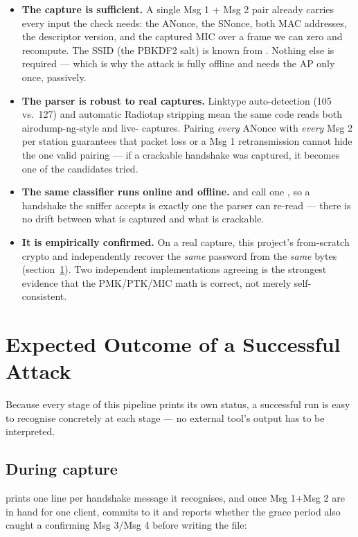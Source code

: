 \begin{itemize}
\item \textbf{The capture is sufficient.} A single Msg 1 + Msg 2 pair already carries every input the check needs: the ANonce, the SNonce, both MAC addresses, the descriptor version, and the captured MIC over a frame we can zero and recompute. The SSID (the PBKDF2 salt) is known from . Nothing else is required --- which is why the attack is fully offline and needs the AP only once, passively.
\item \textbf{The parser is robust to real captures.} Linktype auto-detection (105 vs.\ 127) and automatic Radiotap stripping mean the same code reads both airodump-ng-style and live- captures. Pairing \emph{every} ANonce with \emph{every} Msg 2 per station guarantees that packet loss or a Msg 1 retransmission cannot hide the one valid pairing --- if a crackable handshake was captured, it becomes one of the candidates tried.
\item \textbf{The same classifier runs online and offline.}  and  call one , so a handshake the sniffer accepts is exactly one the parser can re-read --- there is no drift between what is captured and what is crackable.
\item \textbf{It is empirically confirmed.} On a real capture, this project's from-scratch crypto and  independently recover the \emph{same} password from the \emph{same} bytes (section~\ref{sec:outcome}). Two independent implementations agreeing is the strongest evidence that the PMK/PTK/MIC math is correct, not merely self-consistent.
\end{itemize}

\section{Expected Outcome of a Successful Attack}\label{sec:outcome}

Because every stage of this pipeline prints its own status, a successful run is easy to recognise concretely at each stage --- no external tool's output has to be interpreted.

\subsection{During capture}
 prints one line per handshake message it recognises, and once Msg 1+Msg 2 are in hand for one client, commits to it and reports whether the grace period also caught a confirming Msg 3/Msg 4 before writing the file:

